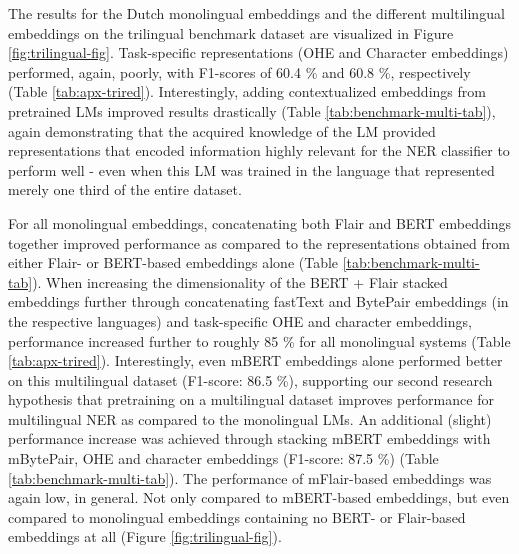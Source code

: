 \documentclass[12pt,a4paper,]{book}
\begin{document}
The results for the Dutch monolingual embeddings and the different multilingual embeddings on the trilingual benchmark dataset are visualized in Figure \ref{fig:trilingual-fig}. Task-specific representations (OHE and Character embeddings) performed, again, poorly, with F1-scores of 60.4 \% and 60.8 \%, respectively (Table \ref{tab:apx-trired}). Interestingly, adding contextualized embeddings from pretrained LMs improved results drastically (Table \ref{tab:benchmark-multi-tab}), again demonstrating that the acquired knowledge of the LM provided representations that encoded information highly relevant for the NER classifier to perform well - even when this LM was trained in the language that represented merely one third of the entire dataset.

For all monolingual embeddings, concatenating both Flair and BERT embeddings together improved performance as compared to the representations obtained from either Flair- or BERT-based embeddings alone (Table \ref{tab:benchmark-multi-tab}). When increasing the dimensionality of the BERT + Flair stacked embeddings further through concatenating fastText and BytePair embeddings (in the respective languages) and task-specific OHE and character embeddings, performance increased further to roughly 85 \% for all monolingual systems (Table \ref{tab:apx-trired}). Interestingly, even mBERT embeddings alone performed better on this multilingual dataset (F1-score: 86.5 \%), supporting our second research hypothesis that pretraining on a multilingual dataset improves performance for multilingual NER as compared to the monolingual LMs. An additional (slight) performance increase was achieved through stacking mBERT embeddings with mBytePair, OHE and character embeddings (F1-score: 87.5 \%) (Table \ref{tab:benchmark-multi-tab}). The performance of mFlair-based embeddings was again low, in general. Not only compared to mBERT-based embeddings, but even compared to monolingual embeddings containing no BERT- or Flair-based embeddings at all (Figure \ref{fig:trilingual-fig}).
\end{document}
